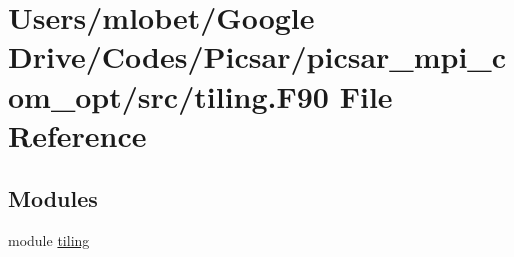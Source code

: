 \hypertarget{tiling_8_f90}{}\section{Users/mlobet/\+Google Drive/\+Codes/\+Picsar/picsar\+\_\+mpi\+\_\+com\+\_\+opt/src/tiling.F90 File Reference}
\label{tiling_8_f90}
\subsection*{Modules}
\begin{DoxyCompactItemize}
\item 
module \hyperlink{namespacetiling}{tiling}
\end{DoxyCompactItemize}
